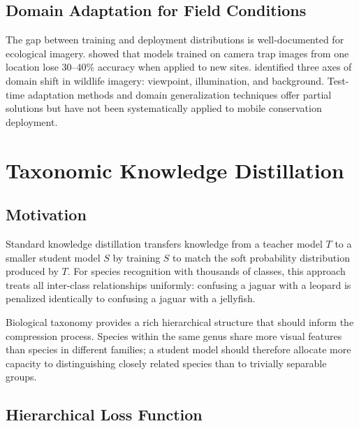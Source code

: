 \documentclass[11pt,a4paper]{article}
\begin{document}
\subsection{Domain Adaptation for Field Conditions}

The gap between training and deployment distributions is well-documented for ecological imagery.
\citet{beery2018recognition} showed that models trained on camera trap images from one location lose 30--40\% accuracy when applied to new sites.
\citet{schneider2020three} identified three axes of domain shift in wildlife imagery: viewpoint, illumination, and background.
Test-time adaptation methods \citep{wang2022continual} and domain generalization techniques \citep{zhou2022domain} offer partial solutions but have not been systematically applied to mobile conservation deployment.

\section{Taxonomic Knowledge Distillation}
\label{sec:distillation}

\subsection{Motivation}

Standard knowledge distillation \citep{hinton2015distilling} transfers knowledge from a teacher model $T$ to a smaller student model $S$ by training $S$ to match the soft probability distribution produced by $T$.
For species recognition with thousands of classes, this approach treats all inter-class relationships uniformly: confusing a jaguar with a leopard is penalized identically to confusing a jaguar with a jellyfish.

Biological taxonomy provides a rich hierarchical structure that should inform the compression process.
Species within the same genus share more visual features than species in different families; a student model should therefore allocate more capacity to distinguishing closely related species than to trivially separable groups.

\subsection{Hierarchical Loss Function}
\end{document}
